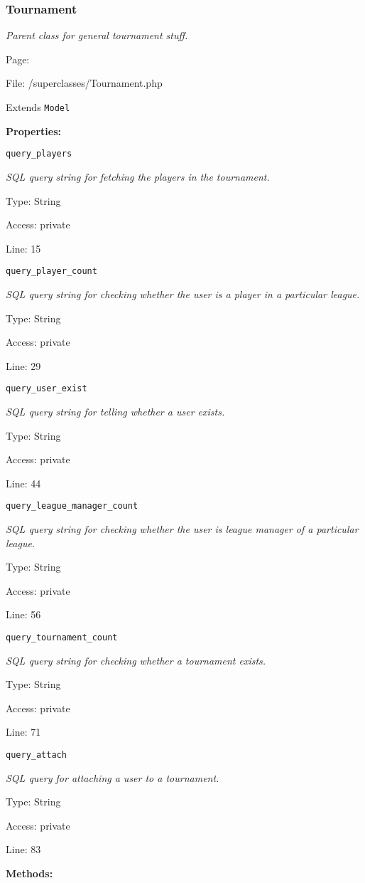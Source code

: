 \subsubsection{Tournament}\label{Tournament.php.doc}
\textit{Parent class for general tournament stuff.}

Page: \pageref{Tournament.php}

File: /superclasses/Tournament.php

Extends \texttt{Model}

\textbf{Properties:}

\texttt{query\_players}

{\scriptsize
\textit{SQL query string for fetching the players in the tournament.}

Type: String

Access: private

Line: 15

}
\texttt{query\_player\_count}

{\scriptsize
\textit{SQL query string for checking whether the user is a player in a particular league.}

Type: String

Access: private

Line: 29

}
\texttt{query\_user\_exist}

{\scriptsize
\textit{SQL query string for telling whether a user exists.}

Type: String

Access: private

Line: 44

}
\texttt{query\_league\_manager\_count}

{\scriptsize
\textit{SQL query string for checking whether the user is league manager of a particular league.}

Type: String

Access: private

Line: 56

}
\texttt{query\_tournament\_count}

{\scriptsize
\textit{SQL query string for checking whether a tournament exists.}

Type: String

Access: private

Line: 71

}
\texttt{query\_attach}

{\scriptsize
\textit{SQL query for attaching a user to a tournament.}

Type: String

Access: private

Line: 83

}
\textbf{Methods:}

